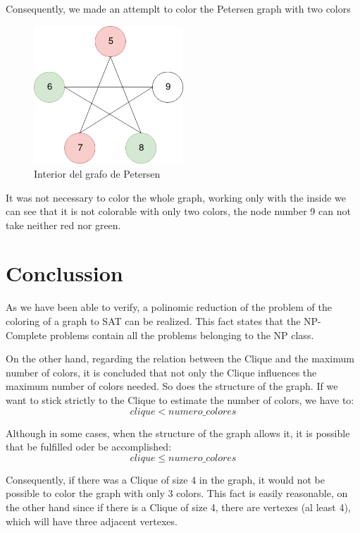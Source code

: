 \documentclass{article}
\begin{document}
    Consequently, we made an attemplt to color the Petersen graph with two colors
    \begin{figure}[H]
        \centering
        \includegraphics[width=0.5\textwidth]{pictures/interior.png}
        \caption{Interior del grafo de Petersen}
    \end{figure}

    It was not necessary to color the whole graph, working only with the inside we can see that it is not colorable with only 
    two colors, the  node number 9 can not take neither red nor green.   


\section{Conclussion}
As we have been able to verify, a polinomic reduction of the problem of the coloring of a graph to SAT can be realized. 
This fact states that the NP-Complete problems contain all the problems belonging to the NP class.

On the other hand, regarding the relation between the Clique and the maximum number of colors, it is concluded that not 
only the Clique influences the maximum number of colors needed. So does the structure of the graph. If we want to stick 
strictly to the Clique to estimate the number of colors, we have to: 
    \[clique < numero\_colores \] 

Although in some cases, when the structure of the graph allows it, it is possible that be fulfilled oder be accomplished: 
    \[clique \leq numero\_colores\]

    Consequently, if there was a Clique of size 4 in the graph, it would not be possible to color the graph with only 3 colors. 
    This fact is easily reasonable, on the other hand since if there is a Clique of size 4, there are vertexes (al least 4), which will have three adjacent vertexes.
\end{document}
